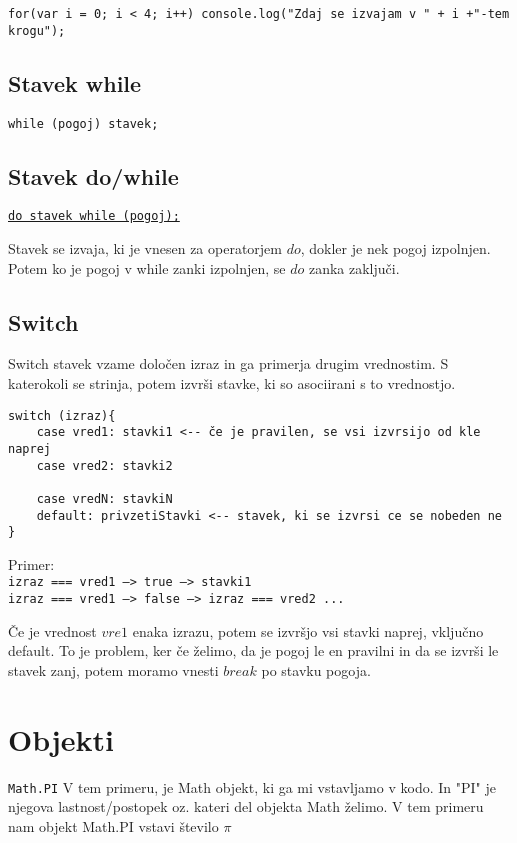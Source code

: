 \begin{verbatim}
for(var i = 0; i < 4; i++) console.log("Zdaj se izvajam v " + i +"-tem krogu");
\end{verbatim}

\subsection{Stavek while}

\texttt{while (pogoj) stavek;}
\newpage

\subsection{Stavek do/while}

\underline{\texttt{do stavek while (pogoj);}}

Stavek se izvaja, ki je vnesen za operatorjem $do$, dokler je nek pogoj izpolnjen. Potem ko je pogoj v while zanki izpolnjen, se $do$ zanka zaključi.

\subsection{Switch}
Switch stavek vzame določen izraz in ga primerja drugim vrednostim. S katerokoli se strinja, potem izvrši stavke, ki so asociirani s to vrednostjo.
\begin{verbatim}
switch (izraz){
    case vred1: stavki1 <-- če je pravilen, se vsi izvrsijo od kle naprej
    case vred2: stavki2
    
    case vredN: stavkiN
    default: privzetiStavki <-- stavek, ki se izvrsi ce se nobeden ne
}
\end{verbatim}
Primer:\\
\texttt{izraz === vred1 --> true --> stavki1}\\
\texttt{izraz === vred1 --> false --> izraz === vred2 ...}

Če je vrednost $vre1$ enaka izrazu, potem se izvršjo vsi stavki naprej, vključno default. To je problem, ker če želimo, da je pogoj le en pravilni in da se izvrši le stavek zanj, potem moramo vnesti $break$ po stavku pogoja.

\section{Objekti}

\texttt{Math.PI}
V tem primeru, je Math objekt, ki ga mi vstavljamo v kodo. In "PI" je njegova lastnost/postopek oz. kateri del objekta Math želimo. V tem primeru nam objekt Math.PI vstavi število $\pi$


